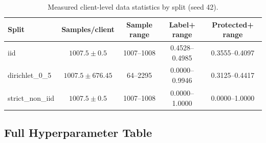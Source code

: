 ﻿\documentclass{article}
\begin{document}
\begin{table}[ht!]
  \caption{Measured client-level data statistics by split (seed 42).}
  \label{tab:partition_stats}
  \centering
  \small
  \begin{tabular}{lcccc}
    \toprule
    \textbf{Split} & \textbf{Samples/client} & \textbf{Sample range} & \textbf{Label+ range} & \textbf{Protected+ range} \\
    \midrule
    iid & $1007.5 \pm 0.5$ & 1007--1008 & 0.4528--0.4985 & 0.3555--0.4097 \\
    dirichlet\_0\_5 & $1007.5 \pm 676.45$ & 64--2295 & 0.0000--0.9946 & 0.3125--0.4417 \\
    strict\_non\_iid & $1007.5 \pm 0.5$ & 1007--1008 & 0.0000--1.0000 & 0.0000--1.0000 \\
    \bottomrule
  \end{tabular}
\end{table}

\subsection{Full Hyperparameter Table}
\end{document}
